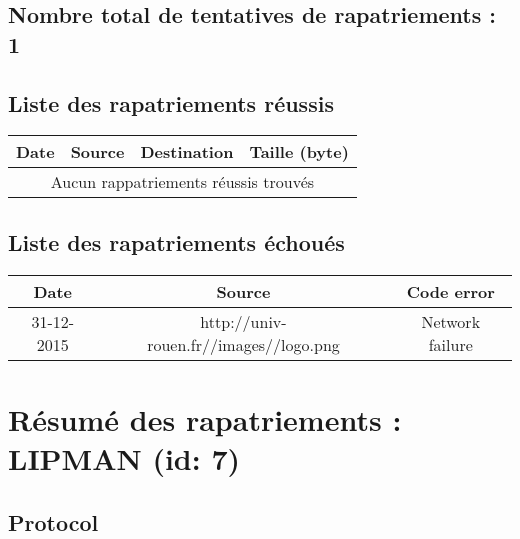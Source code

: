 \documentclass[a4paper,11pt,tikz]{article}
\begin{document}
  \subsection{Nombre total de tentatives de rapatriements : 1}
    
  \subsection{Liste des rapatriements réussis}
    \scalebox{0.7}
    {
      \begin{tabular}{|c|c|c|c|}
        \hline
        Date & Source & Destination & Taille (byte) \\
        \hline
        \multicolumn{4}{|c|}{Aucun rappatriements réussis trouvés} \\
        \hline
      \end{tabular}
    }

  \subsection{Liste des rapatriements échoués}
    \scalebox{0.7}
    {
      \begin{tabular}{|c|c|c|}
        \hline
        Date & Source & Code error  \\
        \hline
           31-12-2015 & http://univ-rouen.fr//images//logo.png & Network failure \\ 
        \hline
      \end{tabular}
    }
\newpage


\section{Résumé des rapatriements : LIPMAN (id: 7)}
  \subsection{Protocol}
\end{document}
